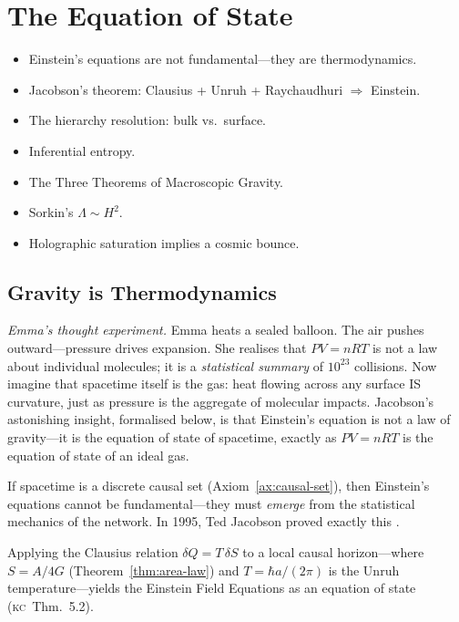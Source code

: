 \documentclass[11pt, a4paper, openany]{book}
\newcommand{\KC}[1]{\textnormal{(\textsc{kc}~#1)}}
\newcounter{thm}[chapter]
\newenvironment{introduction}[1][Modulo Overview]{%
  \begin{tcolorbox}[
    enhanced,colback=structure!5,colframe=structure,
    colbacktitle=structure,coltitle=white,
    fonttitle=\small\bfseries,title={#1},
    arc=2pt,boxrule=0.7pt,
    left=8pt,right=8pt,top=6pt,bottom=6pt,
    before skip=12pt,after skip=12pt
  ]\itshape\begin{itemize}[leftmargin=*,itemsep=2pt,parsep=0pt]
}{%
  \end{itemize}\end{tcolorbox}
}
\begin{document}
\chapter{The Equation of State}\label{ch:equation-of-state}

\begin{introduction}
  \item Einstein's equations are not fundamental---they are thermodynamics.
  \item Jacobson's theorem: Clausius + Unruh + Raychaudhuri $\Rightarrow$
    Einstein.
  \item The hierarchy resolution: bulk vs.\ surface.
  \item Inferential entropy.
  \item The Three Theorems of Macroscopic Gravity.
  \item Sorkin's $\Lambda \sim H^2$.
  \item Holographic saturation implies a cosmic bounce.
\end{introduction}

\section{Gravity is Thermodynamics}

\smallskip\noindent
\textit{Emma's thought experiment.}
Emma heats a sealed balloon. The air pushes outward---pressure drives
expansion. She realises that $PV = nRT$ is not a law about individual
molecules; it is a \emph{statistical summary} of $10^{23}$ collisions.
Now imagine that spacetime itself is the gas: heat flowing across any
surface IS curvature, just as pressure is the aggregate of molecular
impacts. Jacobson's astonishing insight, formalised below, is that
Einstein's equation is not a law of gravity---it is the equation of
state of spacetime, exactly as $PV = nRT$ is the equation of state of
an ideal gas.
\smallskip

\noindent
If spacetime is a discrete causal set (Axiom~\ref{ax:causal-set}), then
Einstein's equations cannot be fundamental---they must \emph{emerge} from
the statistical mechanics of the network. In 1995, Ted Jacobson proved
exactly this \cite{jacobson1995}.

\begin{theorem}[Jacobson]\label{thm:jacobson}
Applying the Clausius relation $\delta Q = T\,\delta S$ to a local
causal horizon---where $S = A/4G$ (Theorem~\ref{thm:area-law}) and
$T = \hbar a/(2\pi)$ is the Unruh temperature---yields the Einstein
Field Equations as an equation of state \KC{Thm.~5.2}.
\end{theorem}
\end{document}
